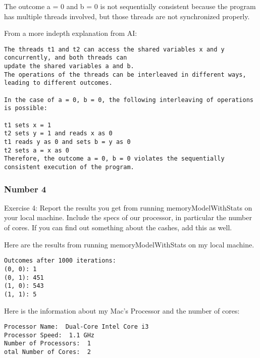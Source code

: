\documentclass{article}
\theoremstyle{theorem}
\theoremstyle{definition}
\theoremstyle{remark}
\begin{document}
\noindent\newline\newline The outcome a = 0 and b = 0 is not sequentially consistent because the program has multiple threads involved, but those threads are not synchronized properly.

\noindent\newline\newline From a more indepth explanation from AI: 
\begin{verbatim}
The threads t1 and t2 can access the shared variables x and y concurrently, and both threads can
update the shared variables a and b. 
The operations of the threads can be interleaved in different ways, leading to different outcomes.

In the case of a = 0, b = 0, the following interleaving of operations is possible:

t1 sets x = 1
t2 sets y = 1 and reads x as 0
t1 reads y as 0 and sets b = y as 0
t2 sets a = x as 0
Therefore, the outcome a = 0, b = 0 violates the sequentially consistent execution of the program.
\end{verbatim}

\subsubsection{Number 4}
\noindent\newline Exercise 4: Report the results you get from running memoryModelWithStats on your local machine. Include the specs of our processor, in particular the number of cores. If you can find out something about the cashes, add this as well. 

\noindent\newline\newline Here are the results from running memoryModelWithStats on my local machine.

\begin{verbatim}
Outcomes after 1000 iterations:
(0, 0): 1
(0, 1): 451
(1, 0): 543
(1, 1): 5
\end{verbatim}

\noindent\newline\newline Here is the information about my Mac's Processor and the number of cores:
\begin{verbatim}
Processor Name:  Dual-Core Intel Core i3
Processor Speed:  1.1 GHz
Number of Processors:  1
otal Number of Cores:  2
\end{verbatim}
\end{document}
